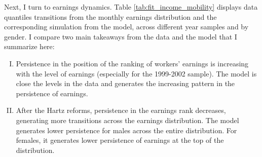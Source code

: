 \documentclass[12pt, a4paper]{article}
\begin{document}
Next, I turn to earnings dynamics. Table \ref{tab:fit_income_mobility} displays data quantiles transitions from the monthly earnings distribution and the corresponding simulation from the model, across different year samples and by gender. I compare two main takeaways from the data and the model that I summarize here:
\begin{enumerate}[I)]
	\item Persistence in the position of the ranking of workers' earnings is increasing with the level of earnings (especially for the 1999-2002 sample). The model is close the levels in the data and generates the increasing pattern in the persistence of earnings.
	\item After the Hartz reforms, persistence in the earnings rank decreases, generating more transitions across the earnings distribution. The model generates lower persistence for males across the entire distribution. For females, it generates lower persistence of earnings at the top of the distribution.
\end{enumerate} 

\end{document}
